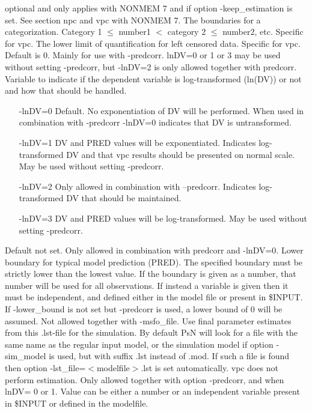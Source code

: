 \begin{optionlist}
\nextopt
{}
optional and only applies with NONMEM 7 and if option -keep\_estimation is set. See section npc and vpc with NONMEM 7. 
\nextopt
{}
The boundaries for a categorization. Category 1 $\leq$ number1 $<$ category 2 $\leq$ number2, etc. Specific for vpc. 
\nextopt
{}
The lower limit of quantification for left censored data. Specific for vpc. 
\nextopt
{}
Default is 0. Mainly for use with -predcorr. lnDV=0 or 1 or 3 may be used without setting -predcorr, but -lnDV=2 is only allowed together with predcorr. Variable to indicate if the dependent variable is log-transformed (ln(DV)) or not and how that should be handled.
\begin{itemize}
	\item[-lnDV=0]  Default. No exponentiation of DV will be performed. When used in combination with -predcorr -lnDV=0 indicates that DV is untransformed.
	\item[-lnDV=1]  DV and PRED values will be exponentiated. Indicates log-transformed DV and that vpc results should be presented on normal scale. May be used without setting -predcorr.
	\item[-lnDV=2]  Only allowed in combination with –predcorr. Indicates log-transformed DV that should be maintained.
	\item[-lnDV=3]  DV and PRED values will be log-transformed. May be used without setting \mbox{-predcorr}.
\end{itemize}
\nextopt
{}
Default not set. Only allowed in combination with predcorr and -lnDV=0. Lower boundary for typical model prediction (PRED). The specified boundary must be strictly lower than the lowest value. If the boundary is given as a number, that number will be used for all observations. If  instead a variable is given then it must be independent, and defined either in the model file or present in \$INPUT.  If -lower\_bound is not set but -predcorr is used, a lower bound of 0 will be assumed. 
\nextopt
{}
Not allowed together with -msfo\_file. Use final parameter estimates from this .lst-file for the simulation. By default PsN will look for a file with the same name as the regular input model, or the simulation model if option -sim\_model is used, but with suffix .lst instead of .mod. If such a file is found then option -lst\_file=$<$modelfile$>$.lst is set automatically. vpc does not perform estimation. 
\nextopt
{}
Only allowed together with option -predcorr, and when lnDV= 0 or 1. Value can be either a number or an independent variable present in \$INPUT or defined in the modelfile.

\end{optionlist}
